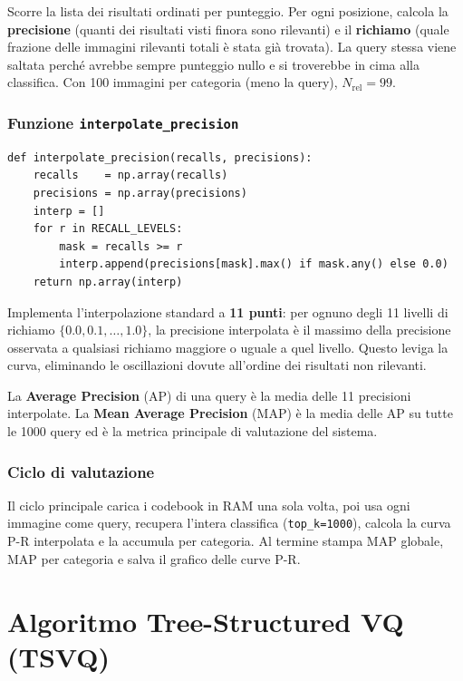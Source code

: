 \documentclass[12pt, a4paper]{article}
\begin{document}
Scorre la lista dei risultati ordinati per punteggio. Per ogni posizione, calcola la
\textbf{precisione} (quanti dei risultati visti finora sono rilevanti) e il \textbf{richiamo}
(quale frazione delle immagini rilevanti totali è stata già trovata). La query stessa viene
saltata perché avrebbe sempre punteggio nullo e si troverebbe in cima alla classifica.
Con 100 immagini per categoria (meno la query), $N_{\text{rel}} = 99$.

\subsubsection{Funzione \texttt{interpolate\_precision}}

\begin{lstlisting}[caption={Interpolazione a 11 punti}]
def interpolate_precision(recalls, precisions):
    recalls    = np.array(recalls)
    precisions = np.array(precisions)
    interp = []
    for r in RECALL_LEVELS:
        mask = recalls >= r
        interp.append(precisions[mask].max() if mask.any() else 0.0)
    return np.array(interp)
\end{lstlisting}

Implementa l'interpolazione standard a \textbf{11 punti}: per ognuno degli 11 livelli di
richiamo $\{0.0, 0.1, \ldots, 1.0\}$, la precisione interpolata è il massimo della
precisione osservata a qualsiasi richiamo maggiore o uguale a quel livello. Questo leviga
la curva, eliminando le oscillazioni dovute all'ordine dei risultati non rilevanti.

La \textbf{Average Precision} (AP) di una query è la media delle 11 precisioni interpolate.
La \textbf{Mean Average Precision} (MAP) è la media delle AP su tutte le 1000 query ed è
la metrica principale di valutazione del sistema.

\subsubsection{Ciclo di valutazione}

Il ciclo principale carica i codebook in RAM una sola volta, poi usa ogni immagine come
query, recupera l'intera classifica (\texttt{top\_k=1000}), calcola la curva P-R interpolata
e la accumula per categoria. Al termine stampa MAP globale, MAP per categoria e salva il
grafico delle curve P-R.

\section{Algoritmo Tree-Structured VQ (TSVQ)}
\label{sec:tsvq}
\end{document}
